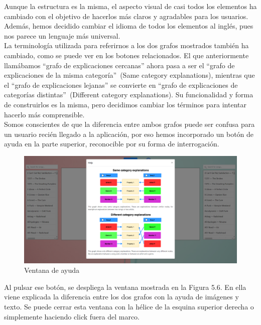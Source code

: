Aunque la estructura es la misma, el aspecto visual de casi todos los elementos ha cambiado con el objetivo de hacerlos más claros y agradables para los usuarios. Además, hemos decidido cambiar el idioma de todos los elementos al inglés, pues nos parece un lenguaje más universal.\\

La terminología utilizada para referirnos a los dos grafos mostrados también ha cambiado, como se puede ver en los botones relacionados. El que anteriormente llamábamos ``grafo de explicaciones cercanas'' ahora pasa a ser el ``grafo de explicaciones de la misma categoría''~(Same category explanations), mientras que el ``grafo de explicaciones lejanas'' se convierte en ``grafo de explicaciones de categorías distintas''~(Different category explanations). Su funcionalidad y forma de construirlos es la misma, pero decidimos cambiar los términos para intentar hacerlo más comprensible.\\

Somos conscientes de que la diferencia entre ambos grafos puede ser confusa para un usuario recién llegado a la aplicación, por eso hemos incorporado un botón de ayuda en la parte superior, reconocible por su forma de interrogación.\\

\begin{figure}[h!]
	\centering
	\includegraphics[width = 1\textwidth]{Imagenes/Bitmap/Pantalla modal.png}
	\caption{Ventana de ayuda}
	\label{fig:sampleImage}
\end{figure}

Al pulsar ese botón, se despliega la ventana mostrada en la Figura 5.6. En ella viene explicada la diferencia entre los dos grafos con la ayuda de imágenes y texto. Se puede cerrar esta ventana con la hélice de la esquina superior derecha o simplemente haciendo click fuera del marco.\\

